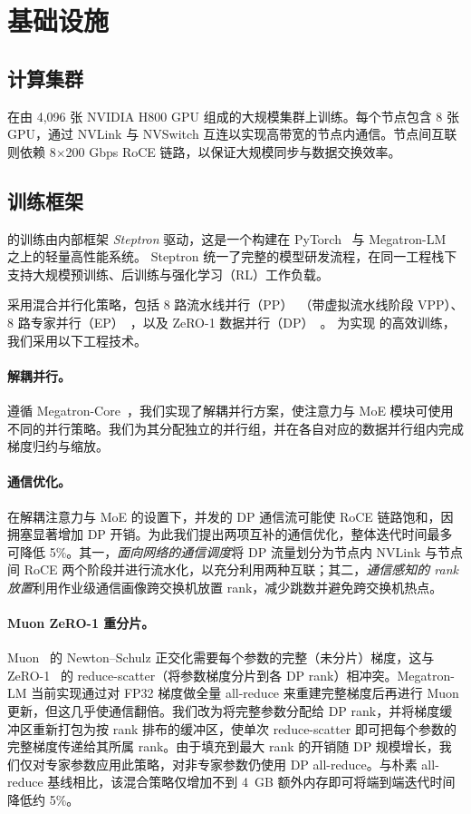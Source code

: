 \section{基础设施}
\label{sec:infra}

\subsection{计算集群}
\ourmodel 在由 4,096 张 NVIDIA H800 GPU 组成的大规模集群上训练。每个节点包含 8 张 GPU，通过 NVLink 与 NVSwitch 互连以实现高带宽的节点内通信。节点间互联则依赖 8×200 Gbps RoCE 链路，以保证大规模同步与数据交换效率。

\subsection{训练框架}
\ourmodel 的训练由内部框架 \emph{Steptron} 驱动，这是一个构建在 PyTorch~\cite{Ansel_PyTorch_2_Faster_2024} 与 Megatron-LM~\cite{megatron-lm} 之上的轻量高性能系统。
Steptron 统一了完整的模型研发流程，在同一工程栈下支持大规模预训练、后训练与强化学习（RL）工作负载。

\ourmodel 采用混合并行化策略，包括 8 路流水线并行（PP）~\cite{narayanan2021efficientlargescalelanguagemodel}（带虚拟流水线阶段 VPP）、8 路专家并行（EP）~\cite{lepikhin2020gshardscalinggiantmodels}，以及 ZeRO-1 数据并行（DP）~\cite{rajbhandari2020zero}。
为实现 \ourmodel 的高效训练，我们采用以下工程技术。

\paragraph{解耦并行。}
遵循 Megatron-Core~\cite{liu2025moeparallelfoldingheterogeneous}，我们实现了解耦并行方案，使注意力与 MoE 模块可使用不同的并行策略。我们为其分配独立的并行组，并在各自对应的数据并行组内完成梯度归约与缩放。

\paragraph{通信优化。}
在解耦注意力与 MoE 的设置下，并发的 DP 通信流可能使 RoCE 链路饱和，因拥塞显著增加 DP 开销。为此我们提出两项互补的通信优化，整体迭代时间最多可降低 5\%。其一，\emph{面向网络的通信调度}将 DP 流量划分为节点内 NVLink 与节点间 RoCE 两个阶段并进行流水化，以充分利用两种互联；其二，\emph{通信感知的 rank 放置}利用作业级通信画像跨交换机放置 rank，减少跳数并避免跨交换机热点。


\paragraph{Muon ZeRO-1 重分片。}
Muon~\cite{jordan2024muon} 的 Newton--Schulz 正交化需要每个参数的完整（未分片）梯度，这与 ZeRO-1~\cite{rajbhandari2020zero} 的 reduce-scatter（将参数梯度分片到各 DP rank）相冲突。Megatron-LM 当前实现通过对 FP32 梯度做全量 all-reduce 来重建完整梯度后再进行 Muon 更新，但这几乎使通信翻倍。我们改为将完整参数分配给 DP rank，并将梯度缓冲区重新打包为按 rank 排布的缓冲区，使单次 reduce-scatter 即可把每个参数的完整梯度传递给其所属 rank。由于填充到最大 rank 的开销随 DP 规模增长，我们仅对专家参数应用此策略，对非专家参数仍使用 DP all-reduce。与朴素 all-reduce 基线相比，该混合策略仅增加不到 4~GB 额外内存即可将端到端迭代时间降低约 5\%。



